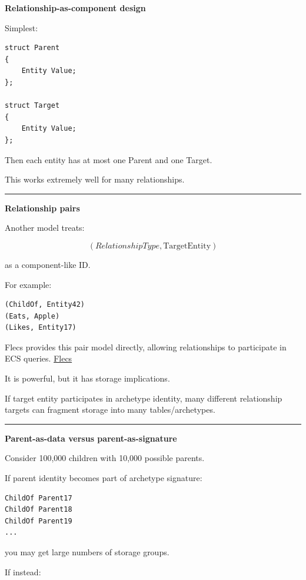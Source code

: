 \textbf{Relationship-as-component design}

Simplest:

\begin{verbatim}
struct Parent
{
    Entity Value;
};

struct Target
{
    Entity Value;
};
\end{verbatim}

Then each entity has at most one Parent and one Target.

This works extremely well for many relationships.

\begin{center}\rule{0.5\linewidth}{0.5pt}\end{center}

\textbf{Relationship pairs}

Another model treats:

\[
(RelationshipType,\text{TargetEntity})
\]

as a component-like ID.

For example:

\begin{verbatim}
(ChildOf, Entity42)
(Eats, Apple)
(Likes, Entity17)
\end{verbatim}

Flecs provides this pair model directly, allowing relationships to participate in ECS queries. \href{https://www.flecs.dev/flecs/Relationships.html?utm_source=chatgpt.com}{Flecs}

It is powerful, but it has storage implications.

If target entity participates in archetype identity, many different relationship targets can fragment storage into many tables/archetypes.

\begin{center}\rule{0.5\linewidth}{0.5pt}\end{center}

\textbf{Parent-as-data versus parent-as-signature}

Consider 100,000 children with 10,000 possible parents.

If parent identity becomes part of archetype signature:

\begin{verbatim}
ChildOf Parent17
ChildOf Parent18
ChildOf Parent19
...
\end{verbatim}

you may get large numbers of storage groups.

If instead:

